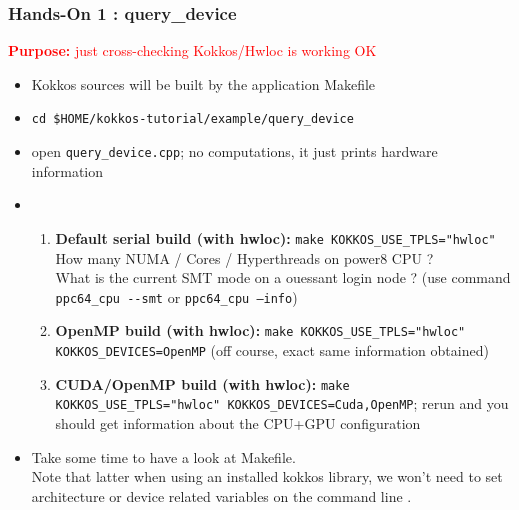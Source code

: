\begin{frame}[fragile=singleslide]
  \frametitle{Hands-On 1 : query\_device}

  {\large\textcolor{red}{\textbf{Purpose:} just cross-checking Kokkos/Hwloc is working OK}}

  \begin{itemize}
  \item Kokkos sources will be built by the application Makefile
  \item \texttt{cd \$HOME/kokkos-tutorial/example/query\_device}
  \item open \texttt{query\_device.cpp}; no computations, it just prints hardware information
  \item 
    \begin{enumerate}
    \item \textbf{Default serial build (with hwloc):} \texttt{make KOKKOS\_USE\_TPLS="hwloc"}\\
      How many NUMA / Cores / Hyperthreads on power8 CPU ?\\
      What is the current SMT mode on a ouessant login node ? (use command \texttt{ppc64\_cpu \--\--smt} or \texttt{ppc64\_cpu --info})
    \item \textbf{OpenMP build (with hwloc):} \texttt{make KOKKOS\_USE\_TPLS="hwloc" KOKKOS\_DEVICES=OpenMP} (off course, exact same information obtained)
    \item \textbf{CUDA/OpenMP build (with hwloc):} \texttt{make KOKKOS\_USE\_TPLS="hwloc" KOKKOS\_DEVICES=Cuda,OpenMP}; rerun and you should get information about the CPU+GPU configuration
    \end{enumerate}
  \item Take some time to have a look at Makefile.\\
    Note that latter when using an installed kokkos library, we won't need to set architecture or device related variables on the command line .
  \end{itemize}

\end{frame}

